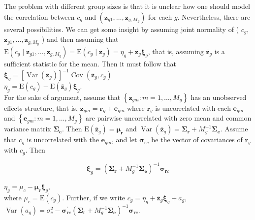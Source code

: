 \documentclass[10pt]{article}
\begin{document}
The problem with different group sizes is that it is unclear how one should model the correlation between $c_{g}$ and $\left(\mathbf{z}_{g 1}, \ldots, \mathbf{z}_{g, M_{g}}\right)$ for each $g$. Nevertheless, there are several possibilities. We can get some insight by assuming joint normality of ( $c_{g}$, $\mathbf{z}_{g 1}, \ldots, \mathbf{z}_{g, M_{g}}$ ) and then assuming that $\mathrm{E}\left(c_{g} \mid \mathbf{z}_{g 1}, \ldots, \mathbf{z}_{g, M_{g}}\right)=\mathrm{E}\left(c_{g} \mid \overline{\mathbf{z}}_{g}\right)=\eta_{g}+\overline{\mathbf{z}}_{g} \boldsymbol{\xi}_{g}$, that is, assuming $\overline{\mathbf{z}}_{g}$ is a sufficient statistic for the mean. Then it must follow that\\
$\boldsymbol{\xi}_{g}=\left[\operatorname{Var}\left(\overline{\mathbf{z}}_{g}\right)\right]^{-1} \operatorname{Cov}\left(\overline{\mathbf{z}}_{g}, c_{g}\right)$\\
$\eta_{g}=\mathrm{E}\left(c_{g}\right)-\mathrm{E}\left(\overline{\mathbf{z}}_{g}\right) \boldsymbol{\xi}_{g}$.\\
For the sake of argument, assume that $\left\{\mathbf{z}_{g m}: m=1, \ldots, M_{g}\right\}$ has an unobserved effects structure, that is, $\mathbf{z}_{g m}=\mathbf{r}_{g}+\mathbf{e}_{g m}$ where $\mathbf{r}_{g}$ is uncorrelated with each $\mathbf{e}_{g m}$ and $\left\{\mathbf{e}_{g m}: m=1, \ldots, M_{g}\right\}$ are pairwise uncorrelated with zero mean and common variance matrix $\boldsymbol{\Sigma}_{\mathbf{e}}$. Then $\mathrm{E}\left(\overline{\mathbf{z}}_{g}\right)=\boldsymbol{\mu}_{\mathbf{r}}$ and $\operatorname{Var}\left(\overline{\mathbf{z}}_{g}\right)=\boldsymbol{\Sigma}_{\mathbf{r}}+M_{g}^{-1} \boldsymbol{\Sigma}_{\mathbf{e}}$. Assume that $c_{g}$ is uncorrelated with the $\mathbf{e}_{g m}$, and let $\boldsymbol{\sigma}_{\mathbf{r} c}$ be the vector of covariances of $\mathbf{r}_{g}$ with $c_{g}$. Then


\begin{equation*}
\boldsymbol{\xi}_{g}=\left(\boldsymbol{\Sigma}_{\mathbf{r}}+M_{g}^{-1} \boldsymbol{\Sigma}_{\mathbf{e}}\right)^{-1} \boldsymbol{\sigma}_{\mathbf{r} c} \tag{20.41}
\end{equation*}


$\eta_{g}=\mu_{c}-\boldsymbol{\mu}_{\mathbf{r}} \boldsymbol{\xi}_{g}$,\\
where $\mu_{c}=\mathrm{E}\left(c_{g}\right)$. Further, if we write $c_{g}=\eta_{g}+\overline{\mathbf{z}}_{g} \boldsymbol{\xi}_{g}+a_{g}$,\\
$\operatorname{Var}\left(a_{g}\right)=\sigma_{c}^{2}-\boldsymbol{\sigma}_{\mathbf{r} c}^{\prime}\left(\boldsymbol{\Sigma}_{\mathbf{r}}+M_{g}^{-1} \boldsymbol{\Sigma}_{\mathbf{e}}\right)^{-1} \boldsymbol{\sigma}_{\mathbf{r} c}$.
\end{document}
